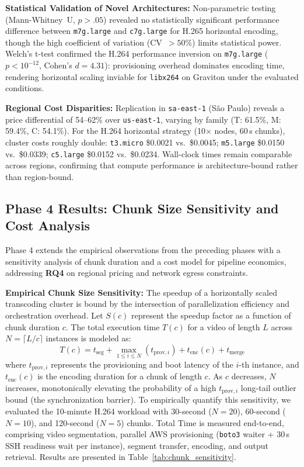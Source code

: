 \documentclass[conference]{IEEEtran}
\begin{document}
\textbf{Statistical Validation of Novel Architectures:} Non-parametric testing (Mann-Whitney~U, $p > .05$) revealed no statistically significant performance difference between \texttt{m7g.large} and \texttt{c7g.large} for H.265 horizontal encoding, though the high coefficient of variation (CV~$>50\%$) limits statistical power. Welch's t-test confirmed the H.264 performance inversion on \texttt{m7g.large} ($p < 10^{-12}$, Cohen's $d = 4.31$): provisioning overhead dominates encoding time, rendering horizontal scaling inviable for \texttt{libx264} on Graviton under the evaluated conditions.

\textbf{Regional Cost Disparities:} Replication in \texttt{sa-east-1} (São Paulo) reveals a price differential of 54--62\% over \texttt{us-east-1}, varying by family (T: 61.5\%, M: 59.4\%, C: 54.1\%). For the H.264 horizontal strategy (10$\times$ nodes, 60\,s chunks), cluster costs roughly double: \texttt{t3.micro} \$0.0021 vs.\ \$0.0045; \texttt{m5.large} \$0.0150 vs.\ \$0.0339; \texttt{c5.large} \$0.0152 vs.\ \$0.0234. Wall-clock times remain comparable across regions, confirming that compute performance is architecture-bound rather than region-bound.

\subsection{Phase 4 Results: Chunk Size Sensitivity and Cost Analysis}
\label{results-phase4}

Phase 4 extends the empirical observations from the preceding phases with a sensitivity analysis of chunk duration and a cost model for pipeline economics, addressing \textbf{RQ4} on regional pricing and network egress constraints.

\textbf{Empirical Chunk Size Sensitivity:}
The speedup of a horizontally scaled transcoding cluster is bound by the intersection of parallelization efficiency and orchestration overhead. Let $S(c)$ represent the speedup factor as a function of chunk duration $c$. The total execution time $T(c)$ for a video of length $L$ across $N = \lceil L/c \rceil$ instances is modeled as:
\begin{equation}
T(c) = t_{\text{seg}} + \max_{1 \le i \le N} \left( t_{\text{prov},i} \right) + t_{\text{enc}}(c) + t_{\text{merge}}
\end{equation}
where $t_{\text{prov},i}$ represents the provisioning and boot latency of the $i$-th instance, and $t_{\text{enc}}(c)$ is the encoding duration for a chunk of length $c$. As $c$ decreases, $N$ increases, monotonically elevating the probability of a high $t_{\text{prov},i}$ long-tail outlier bound (the synchronization barrier). To empirically quantify this sensitivity, we evaluated the 10-minute H.264 workload with 30-second ($N=20$), 60-second ($N=10$), and 120-second ($N=5$) chunks. Total Time is measured end-to-end, comprising video segmentation, parallel AWS provisioning (\texttt{boto3} waiter + 30\,s SSH readiness wait per instance), segment transfer, encoding, and output retrieval. Results are presented in Table~\ref{tab:chunk_sensitivity}.
\end{document}
